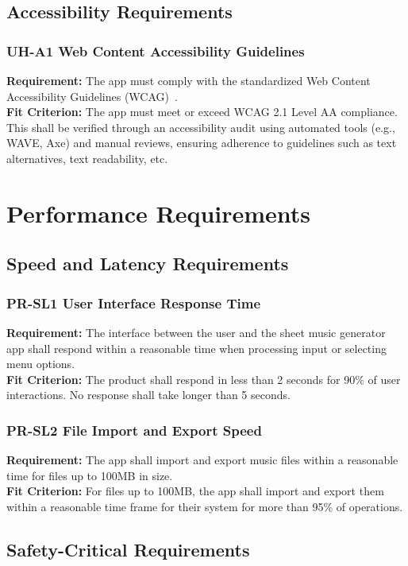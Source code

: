 \documentclass[12pt]{article}
\begin{document}
\subsection{Accessibility Requirements}
\subsubsection*{UH-A1 Web Content Accessibility Guidelines} \label{UH-A1}
\textbf{Requirement:} The app must comply with the standardized Web Content Accessibility Guidelines (WCAG)~\cite{WCAG21}.\\
\textbf{Fit Criterion:} The app must meet or exceed WCAG 2.1 Level AA compliance. This shall be verified through 
an accessibility audit using automated tools (e.g., WAVE, Axe) and manual reviews, ensuring adherence to guidelines 
such as text alternatives, text readability, etc.
\section{Performance Requirements}
\subsection{Speed and Latency Requirements}
\subsubsection*{PR-SL1 User Interface Response Time} \label{PR-SL1}
\textbf{Requirement:} The interface between the user and the sheet music generator app shall respond within a reasonable time when processing input or selecting menu options.\\
\textbf{Fit Criterion:} The product shall respond in less than 2 seconds for 90\% of user interactions. No response shall take longer than 5 seconds.
\subsubsection*{PR-SL2 File Import and Export Speed} \label{PR-SL2}
\textbf{Requirement:} The app shall import and export music files within a reasonable time for files up to 100MB in size.\\
\textbf{Fit Criterion:} For files up to 100MB, the app shall import and export them within a reasonable time frame for their system for more than 95\% of operations.

\subsection{Safety-Critical Requirements}
\end{document}
